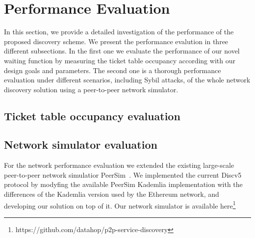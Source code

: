 
\section{Performance Evaluation}
\label{sec:eval}

In  this  section,  we  provide  a  detailed  investigation  of  the performance of the proposed discovery scheme.
We present the performance evalution in three different subsections. 
In the first one we evaluate the performance of our novel waiting function by measuring the ticket table occupancy
according with our design goals and parameters.
The second one is a thorough performance evaluation under different scenarios, including Sybil attacks, of the whole network discovery solution using a peer-to-peer network simulator.

\subsection{Ticket table occupancy evaluation}


\subsection{Network simulator evaluation}



For the network performance evaluation we extended the existing 
large-scale peer-to-peer network simulatior PeerSim~\cite{p2p09-peersim}.
We implemented the current Discv5 protocol by modyfing the available PeerSim Kademlia implementation with the differences of the Kademlia version used by the Ethereum network, and developing our solution on top of it. Our network simulator is available here\footnote{https://github.com/datahop/p2p-service-discovery}

